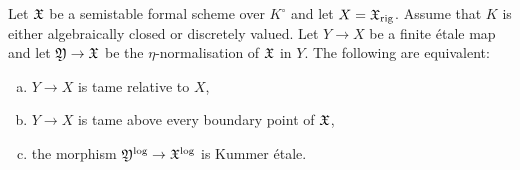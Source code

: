 \begin{thm} \label{thm:Abhyankar-formal-more-precise}
  Let ${\mathfrak{X}}$ be a semistable formal scheme over $K^\circ$ and let $X={\mathfrak{X}}_{\rm rig}$.  Assume that $K$ is either algebraically closed or discretely valued. 
 Let $Y\to X$ be a finite \'etale map and let ${\mathfrak{Y}}\to {\mathfrak{X}}$ be the $\eta$-normalisation of ${\mathfrak{X}}$ in $Y$. The following are equivalent:
  \begin{enumerate}[(a)]
    \item \label{propitem:f-Abhy-tame} 
        $Y\to X$ is tame relative to $X$,
    \item \label{propitem:f-Abhy-tame-boundary}
        $Y\to X$ is tame above every boundary point of ${\mathfrak{X}}$, 
    \item \label{propitem:f-Abhy-ket}
        the morphism ${\mathfrak{Y}}^{\rm log}\to{\mathfrak{X}}^{\rm log}$ is Kummer \'etale.
  \end{enumerate}
\end{thm}


